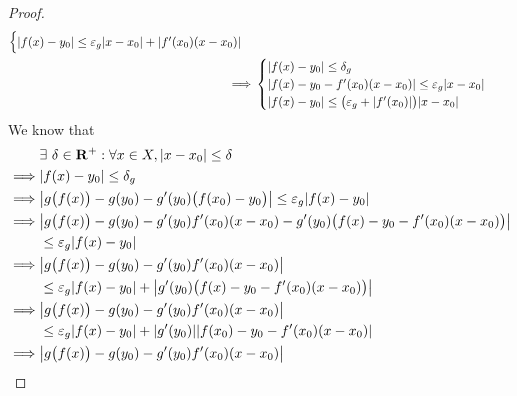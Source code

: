 \begin{proof}
\begin{align*}
\begin{cases}
                       \abs*{f(x) - y_0} \leq \varepsilon_g \abs*{x - x_0} + \abs*{f'(x_0) (x - x_0)}
                   \end{cases}                                               \\
        \implies & \begin{cases}
                       \abs*{f(x) - y_0} \leq \delta_g                                         \\
                       \abs*{f(x) - y_0 - f'(x_0) (x - x_0)} \leq \varepsilon_g \abs*{x - x_0} \\
                       \abs*{f(x) - y_0} \leq \big(\varepsilon_g + \abs*{f'(x_0)}\big) \abs*{x - x_0}
                   \end{cases}
    \end{align*}
    We know that
    \begin{align*}
                 & \exists\ \delta \in \mathbf{R}^+ : \forall x \in X, \abs*{x - x_0} \leq \delta                                           \\
        \implies & \abs*{f(x) - y_0} \leq \delta_g                                                                                          \\
        \implies & \abs*{g\big(f(x)\big) - g(y_0) - g'(y_0) \big(f(x_0) - y_0\big)} \leq \varepsilon_g \abs*{f(x) - y_0}                    \\
        \implies & \abs*{g\big(f(x)\big) - g(y_0) - g'(y_0) f'(x_0) (x - x_0) - g'(y_0) \big(f(x) - y_0 - f'(x_0) (x - x_0)\big)}           \\
                 & \leq \varepsilon_g \abs*{f(x) - y_0}                                                                                     \\
        \implies & \abs*{g\big(f(x)\big) - g(y_0) - g'(y_0) f'(x_0) (x - x_0)}                                                              \\
                 & \leq \varepsilon_g \abs*{f(x) - y_0} + \abs*{g'(y_0) \big(f(x) - y_0 - f'(x_0) (x - x_0)\big)}                           \\
        \implies & \abs*{g\big(f(x)\big) - g(y_0) - g'(y_0) f'(x_0) (x - x_0)}                                                              \\
                 & \leq \varepsilon_g \abs*{f(x) - y_0} + \abs*{g'(y_0)} \abs*{f(x_0) - y_0 - f'(x_0) (x - x_0)}                            \\
        \implies & \abs*{g\big(f(x)\big) - g(y_0) - g'(y_0) f'(x_0) (x - x_0)}                                                              \\

\end{align*}
\end{proof}

